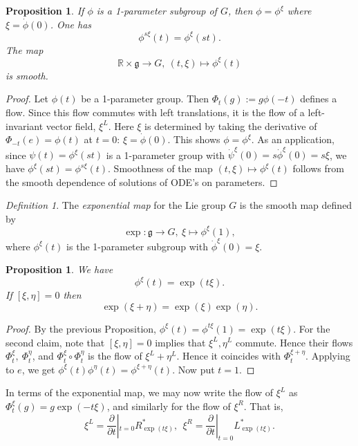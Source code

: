 \documentclass{article}
\newtheorem{proposition}[theorem]{Proposition}
\theoremstyle{remark}
\newtheorem{definition}[theorem]{Definition}
\newcommand{\R}{\mathbb{R}}
\newcommand\lie[1]{\mathfrak{#1}}
\newcommand{\g}{\lie{g}}
\newcommand{\f}{\frac}
\newcommand{\p}{\partial}
\begin{document}
\begin{proposition}
If $\phi$ is a 1-parameter subgroup of $G$, then $\phi=\phi^\xi$ where 
$\xi=\dot{\phi}(0)$. One has 
%
\[ \phi^{s\xi}(t)=\phi^\xi(st).\]
%
The map 
\[ \R\times\g\to G,\ (t,\xi)\mapsto \phi^\xi(t)\]
is smooth. 
\end{proposition}
\begin{proof}
Let $\phi(t)$ be a 1-parameter group. 
Then $\Phi_t(g):=g\phi(-t)$
defines a flow. Since this flow commutes with left translations, it is
the flow of a left-invariant vector field, $\xi^L$. Here $\xi$ is
determined by taking the derivative of $\Phi_{-t}(e)=\phi(t)$ at
$t=0$: $\xi=\dot{\phi}(0)$.  This shows $\phi=\phi^\xi$. As an application, 
since $\psi(t)=\phi^{\xi}(st)$ is a 1-parameter group with 
$\dot{\psi}^{\xi}(0)=s\dot{\phi}^\xi(0)=s\xi$, we have 
$\phi^\xi(st)=\phi^{s\xi}(t)$. Smoothness of the map $(t,\xi)\mapsto
\phi^\xi(t)$ follows from the smooth dependence of solutions of ODE's
on parameters.
\end{proof}


%
\begin{definition} 
The \emph{exponential map} for the Lie group $G$ is the smooth map defined by
%
\[ \exp\colon \g\to G,\ \xi\mapsto \phi^\xi(1),\]
% 
where $\phi^\xi(t)$ is the 1-parameter subgroup with $\dot{\phi}^\xi(0)=\xi$. 
\end{definition}
%
\begin{proposition}
We have 
\[ \phi^\xi(t)=\exp(t\xi).\] 
%
If $[\xi,\eta]=0$ then 
%
\[ \exp(\xi+\eta)=\exp(\xi)\exp(\eta).\]
%
\end{proposition}
\begin{proof}
By the previous Proposition, $\phi^\xi(t)=\phi^{t\xi}(1)=\exp(t\xi)$. 
 For the second claim, note that 
$[\xi,\eta]=0$ implies that $\xi^L,\eta^L$ commute. Hence their flows $\Phi^\xi_t,\ \Phi^\eta_t$, and 
$\Phi^\xi_t \circ \Phi^\eta_t$ is the flow of $\xi^L+\eta^L$. Hence it coincides with 
$\Phi^{\xi+\eta}_t$. Applying to $e$, we get $\phi^\xi(t)\phi^\eta(t)=\phi^{\xi+\eta}(t)$. Now put $t=1$. 
\end{proof}

In terms of the exponential map, we may now write the flow of $\xi^L$ as 
$\Phi^\xi_t(g)=g\exp(-t\xi)$, and similarly for the flow of $\xi^R$. 
That is, 
\[ \xi^L=\f{\p}{\p t}|_{t=0}R_{\exp(t\xi)}^*,\ \ 
\xi^R=\f{\p}{\p t}|_{t=0}L_{\exp(t\xi)}^*.\]
\end{document}
